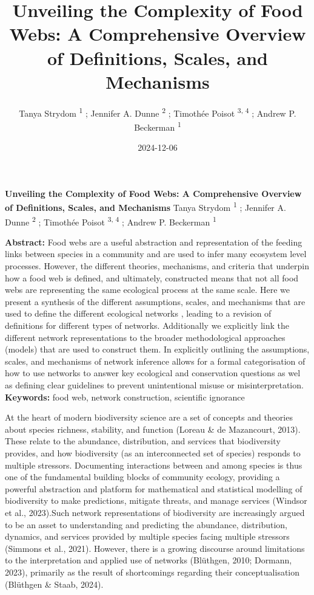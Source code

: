 \documentclass[
]{article}
\title{Unveiling the Complexity of Food Webs: A Comprehensive Overview
of Definitions, Scales, and Mechanisms}
\author{Tanya Strydom %
%
\textsuperscript{%
%
1%
}%
; Jennifer A. Dunne %
%
\textsuperscript{%
%
2%
}%
; Timothée Poisot %
%
\textsuperscript{%
3,%
4%
}%
; Andrew P. Beckerman %
%
\textsuperscript{%
%
1%
}%
}
\date{2024-12-06}
\begin{document}
\thispagestyle{empty}
{\bfseries\sffamily\Large Unveiling the Complexity of Food Webs: A
Comprehensive Overview of Definitions, Scales, and Mechanisms}
\vfil
Tanya Strydom %
%
\textsuperscript{%
%
1%
}%
; Jennifer A. Dunne %
%
\textsuperscript{%
%
2%
}%
; Timothée Poisot %
%
\textsuperscript{%
3,%
4%
}%
; Andrew P. Beckerman %
%
\textsuperscript{%
%
1%
}%

\vfil
{\small
\textbf{Abstract:} Food webs are a useful abstraction and representation
of the feeding links between species in a community and are used to
infer many ecosystem level processes. However, the different theories,
mechanisms, and criteria that underpin how a food web is defined, and
ultimately, constructed means that not all food webs are representing
the same ecological process at the same scale. Here we present a
synthesis of the different assumptions, scales, and mechanisms that are
used to define the different ecological networks , leading to a revision
of definitions for different types of networks. Additionally we
explicitly link the different network representations to the broader
methodological approaches (models) that are used to construct them. In
explicitly outlining the assumptions, scales, and mechanisms of network
inference allows for a formal categorisation of how to use networks to
answer key ecological and conservation questions as wel as defining
clear guidelines to prevent unintentional misuse or misinterpretation.
\vfil
\textbf{Keywords:} %
food web, network construction, %
scientific ignorance%
}
\clearpage
\setcounter{page}{1}
\doublespacing
\linenumbers


At the heart of modern biodiversity science are a set of concepts and
theories about species richness, stability, and function (Loreau \& de
Mazancourt, 2013). These relate to the abundance, distribution, and
services that biodiversity provides, and how biodiversity (as an
interconnected set of species) responds to multiple stressors.
Documenting interactions between and among species is thus one of the
fundamental building blocks of community ecology, providing a powerful
abstraction and platform for mathematical and statistical modelling of
biodiversity to make predictions, mitigate threats, and manage services
(Windsor et al., 2023).Such network representations of biodiversity are
increasingly argued to be an asset to understanding and predicting the
abundance, distribution, dynamics, and services provided by multiple
species facing multiple stressors (Simmons et al., 2021). However, there
is a growing discourse around limitations to the interpretation and
applied use of networks (Blüthgen, 2010; Dormann, 2023), primarily as
the result of shortcomings regarding their conceptualisation (Blüthgen
\& Staab, 2024).
\end{document}

